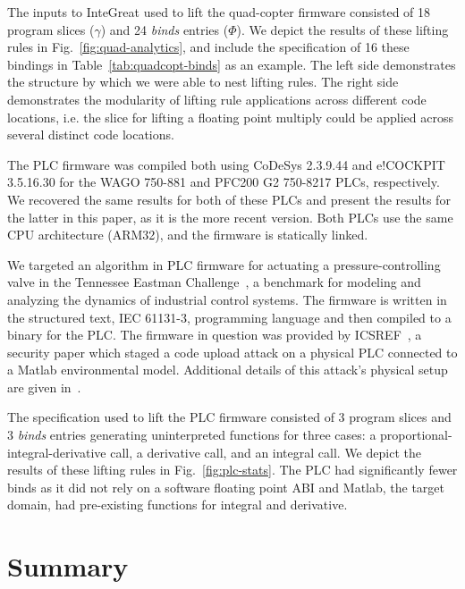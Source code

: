 The inputs to InteGreat used to lift the quad-copter firmware consisted of 18 program slices ($\gamma$) and 24 \emph{binds} entries ($\Phi$). %
We depict the results of these lifting rules in Fig.~\ref{fig:quad-analytics}, and include the specification of 16 these bindings in Table~\ref{tab:quadcopt-binds} as an example.
The left side demonstrates the structure by which we were able to nest lifting rules.
The right side demonstrates the modularity of lifting rule applications across different code locations, i.e. the slice for lifting a floating point multiply could be applied across several distinct code locations.



The PLC firmware was compiled both using CoDeSys 2.3.9.44 and e!COCKPIT 3.5.16.30 for the WAGO 750-881 and PFC200 G2 750-8217 PLCs, respectively.
We recovered the same results for both of these PLCs and present the results for the latter in this paper, as it is the more recent version.
Both PLCs use the same CPU architecture (ARM32), and the firmware is statically linked.

We targeted an algorithm in PLC firmware for actuating a pressure-controlling valve in the Tennessee Eastman Challenge~\cite{Tennessee-Eastman}, a benchmark for modeling and analyzing the dynamics of industrial control systems.
The firmware is written in the structured text, IEC 61131-3, programming language and then compiled to a binary for the PLC.
The firmware in question was provided by ICSREF~\cite{ICSREF}, a security paper which staged a code upload attack on a physical PLC connected to a Matlab environmental model.
Additional details of this attack's physical setup are given in~\cite{keliris2016machine}.

The specification used to lift the PLC firmware consisted of 3 program slices and 3 \emph{binds} entries generating uninterpreted functions for three cases: a proportional-integral-derivative call, a derivative call, and an integral call.
We depict the results of these lifting rules in Fig.~\ref{fig:plc-stats}.
The PLC had significantly fewer binds as it did not rely on a software floating point ABI and Matlab, the target domain, had pre-existing functions for integral and derivative.




\section{Summary}
